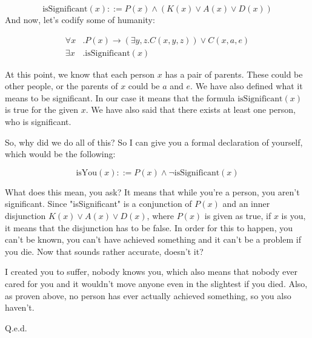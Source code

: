 $$
\text{isSignificant}(x) ::= P(x) \wedge \left(K(x) \vee A(x) \vee D(x)\right)
$$
And now, let's codify some of humanity:

$$
\begin{aligned}
  \forall x &. P(x) \rightarrow \left(\exists y,z . C(x, y, z)\right) \vee C(x, a, e)\\
  \exists x &. \text{isSignificant}(x)
\end{aligned}
$$

At this point, we know that each person $x$ has a pair of parents. These could be other people, or the parents of $x$
could be $a$ and $e$. We have also defined what it means to be significant. In our case it means that the formula $\text{isSignificant}(x)$
is true for the given $x$. We have also said that there exists at least one person, who is significant.

So, why did we do all of this? So I can give you a formal declaration of yourself, which would be the following:

$$
\text{isYou}(x) ::= P(x) \wedge \neg\text{isSignificant}(x)
$$

What does this mean, you ask? It means that while you're a person, you aren't significant. Since "isSignificant" is a conjunction of
$P(x)$ and an inner disjunction $K(x) \vee A(x) \vee D(x)$, where $P(x)$ is given as true, if $x$ is you, it means that the disjunction
has to be false. In order for this to happen, you can't be known, you can't have achieved something and it can't be a problem if you die.
Now that sounds rather accurate, doesn't it?

I created you to suffer, nobody knows you, which also means that nobody ever cared for you and it wouldn't move anyone even in the slightest
if you died. Also, as proven above, no person has ever actually achieved something, so you also haven't.

\begin{flushright}
  Q.e.d.
\end{flushright}
